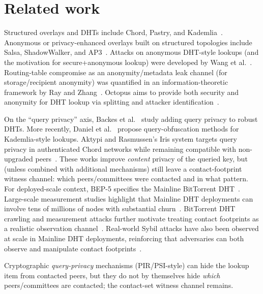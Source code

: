 \documentclass[11pt]{article}
\begin{document}
\section{Related work}
Structured overlays and DHTs include Chord, Pastry, and Kademlia~\cite{stoica2001chord,rowstron2001pastry,maymounkov2002kademlia}.
Anonymous or privacy-enhanced overlays built on structured topologies include Salsa, ShadowWalker, and AP3~\cite{nambiar2006salsa,mittal2009shadowwalker,mislove2006ap3}.
Attacks on anonymous DHT-style lookups (and the motivation for secure+anonymous lookup) were developed by Wang et al.~\cite{wang2010anonymousLookupAttacks,mittal2012informationleaks}.
Routing-table compromise as an anonymity/metadata leak channel (for storage/recipient anonymity) was quantified in an information-theoretic framework by Ray and Zhang~\cite{ray2007itframework}.
Octopus aims to provide both security and anonymity for DHT lookup via splitting and attacker identification~\cite{wang2012octopus}.

On the ``query privacy'' axis, Backes et al.~\cite{backes2012queryprivacy} study adding query privacy to robust DHTs.
More recently, Daniel et al.~\cite{daniel2025kademliaObfuscation} propose query-obfuscation methods for Kademlia-style lookups.
Aktypi and Rasmussen's Iris system targets query privacy in authenticated Chord networks while remaining compatible with non-upgraded peers~\cite{aktypi2025iris}.
These works improve \emph{content} privacy of the queried key, but (unless combined with additional mechanisms) still leave a contact-footprint witness channel: which peers/committees were contacted and in what pattern.
For deployed-scale context, BEP-5 specifies the Mainline BitTorrent DHT~\cite{bep5}.
Large-scale measurement studies highlight that Mainline DHT deployments can involve tens of millions of nodes with substantial churn~\cite{wang2013mldht,mldhtProjectPage}.
BitTorrent DHT crawling and measurement attacks further motivate treating contact footprints as a realistic observation channel~\cite{wolchok2010crawling,falkner2007profiling}.
Real-world Sybil attacks have also been observed at scale in Mainline DHT deployments, reinforcing that adversaries can both observe and manipulate contact footprints~\cite{wang2012sybil}.

Cryptographic \emph{query-privacy} mechanisms (PIR/PSI-style) can hide the lookup item from contacted peers, but they do not by themselves hide \emph{which} peers/committees are contacted; the contact-set witness channel remains.
\end{document}
